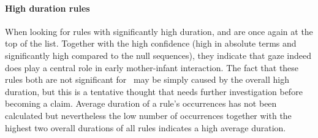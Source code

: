 \paragraph{High duration rules}
When looking for rules with significantly high duration,  and  are once again at the top of the list.
Together with the high confidence (high in absolute terms and significantly high compared to the null sequences), they indicate that gaze indeed does play a central role in early mother-infant interaction.
The fact that these rules both are not significant for \noc\ may be simply caused by the overall high duration, but this is a tentative thought that needs further investigation before becoming a claim.
Average duration of a rule's occurrences has not been calculated but nevertheless the low number of occurrences together with the highest two overall durations of all rules indicates a high average duration.























































